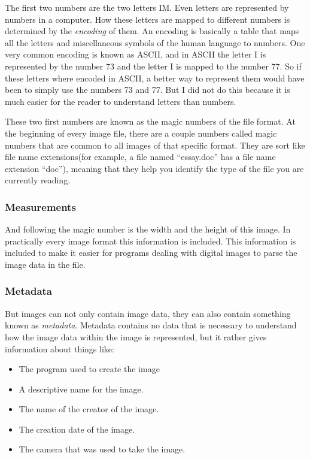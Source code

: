 The first two numbers are the two letters IM. Even letters are
represented by numbers in a computer. How these letters are mapped to
different numbers is determined by the \textit{encoding} of them. An
encoding is basically a table that maps all the letters and
miscellaneous symbols of the human language to numbers. One very
common encoding is known as ASCII, and in ASCII the letter I is
represented by the number 73 and the letter I is mapped to the number
77. So if these letters where encoded in ASCII, a better way to
represent them would have been to simply use the numbers 73 and
77. But I did not do this because it is much easier for the reader to
understand letters than numbers.

These two first numbers are known as the magic numbers  of the file format. At the beginning of every image file,
there are a couple numbers called magic numbers that are common to all
images of that specific format. They are sort like file name
extensions(for example, a file named ``essay.doc'' has a file name
extension ``doc''), meaning that they help you identify the type of
the file you are currently reading.

\subsubsection{Measurements}

And following the magic number is the width and the height of this
image. In practically every image format this information is
included. This information is included to make it easier for programs
dealing with digital images to parse the image data in the file.

\subsubsection{Metadata}

But images can not only contain image data, they can also contain
something known as \textit{metadata}. Metadata contains no data that
is necessary to understand how the image data within the image is
represented, but it rather gives information about things like:

\begin{itemize}
\item The program used to create the image
\item A descriptive name for the image.
\item The name of the creator of the image.
\item The creation date of the image.
\item The camera that was used to take the image.
\end{itemize}

